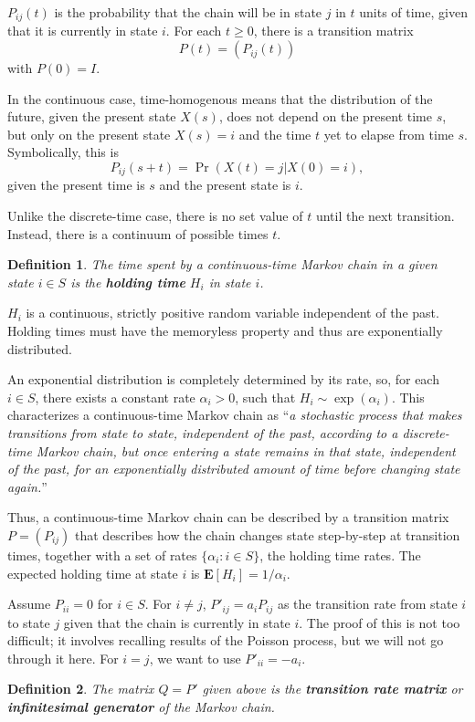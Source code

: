 \documentclass[11pt]{article}
\newtheorem{definition}{Definition}[section]
\begin{document}
$P_{ij}(t)$ is the probability that the chain will be in state $j$ in $t$ units of time, given that it is currently in state $i$. For each $t\geq 0$, there is a transition matrix
$$P(t) = (P_{ij}(t))$$
with $P(0)=I$.

In the continuous case, time-homogenous means that the distribution of the future, given the present state $X(s)$, does not depend on the present time $s$, but only on the present state $X(s)=i$ and the time $t$ yet to elapse from time $s$. Symbolically, this is
$$P_{ij}(s+t) = \Pr(X(t) = j|X(0)=i),$$
given the present time is $s$ and the present state is $i$.

Unlike the discrete-time case, there is no set value of $t$ until the next transition. Instead, there is a continuum of possible times $t$.

\begin{definition}
The time spent by a continuous-time Markov chain in a given state $i\in S$ is the \textbf{holding time} $H_i$ in state $i$.
\end{definition}
$H_i$ is a continuous, strictly positive random variable independent of the past. Holding times must have the memoryless property and thus are exponentially distributed.
 
An exponential distribution is completely determined by its rate, so, for each $i\in S$, there exists a constant rate $\alpha_i >0$, such that $H_i \sim \exp(\alpha_i)$. This characterizes a continuous-time Markov chain as ``\textit{a stochastic process that makes transitions from state to state, independent of the past, according to a discrete-time Markov chain, but once entering a state remains in that state, independent of the past, for an exponentially distributed amount of time before changing state again.}''

Thus, a continuous-time Markov chain can be described by a transition matrix $P=(P_{ij})$ that describes how the chain changes state step-by-step at transition times, together with a set of rates $\{\alpha_i:i\in S\}$, the holding time rates. The expected holding time at state $i$ is $\mathbf{E}[H_i] = 1/\alpha_i$.

Assume $P_{ii}=0$ for $i\in S$. For $i\neq j$, $P'_{ij} = a_i P_{ij}$ as the transition rate from state $i$ to state $j$ given that the chain is currently in state $i$. The proof of this is not too difficult; it involves recalling results of the Poisson process, but we will not go through it here. For $i=j$, we want to use $P'_{ii} = -a_i$.

\begin{definition}
The matrix $Q=P'$ given above is the \textbf{transition rate matrix} or \textbf{infinitesimal generator} of the Markov chain.
\end{definition}
\end{document}
